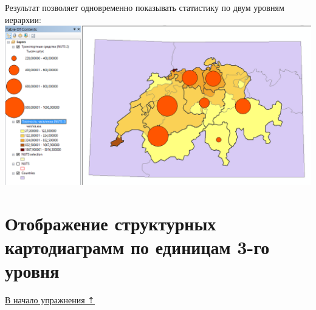 \documentclass[]{book}
\theoremstyle{definition}
\theoremstyle{definition}
\theoremstyle{definition}
\theoremstyle{remark}
\begin{document}
Результат позволяет одновременно показывать статистику по двум уровням
иерархии: \includegraphics{images/Ex08/image27.png}

\hypertarget{stat-map-economic-diagrams3}{%
\section{Отображение структурных картодиаграмм по единицам 3-го
уровня}\label{stat-map-economic-diagrams3}}

\protect\hyperlink{stat-map-economic}{В начало упражнения ⇡}
\end{document}
